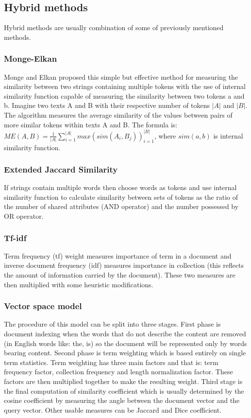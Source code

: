 \subsection{Hybrid methods}
Hybrid methods are usually combination of some of previously mentioned methods.
\subsubsection{Monge-Elkan}
Monge and Elkan proposed this simple but effective method for measuring the similarity between two strings containing multiple tokens with the use of internal similarity function capable of measuring the similarity between two tokens a and b. 
Imagine two texts A and B with their respective number of tokens $\lvert A \rvert$ and $\lvert B\rvert$. 
The algorithm measures the average similarity of the values between pairs of more similar tokens within texts A and B. 
The formula is: 
$ME(A,B)=\frac{1}{\lvert A \rvert} \sum_{i=1}^{\lvert A \rvert} max (sim(A_i, B_j))_{i=1}^{\lvert B\rvert}$, where $sim(a, b)$ is internal similarity function.
\subsubsection{Extended Jaccard Similarity}
If strings contain multiple words then choose words as tokens and use internal similarity function to calculate similarity between sets of tokens as the ratio of the number of shared attributes (AND operator) and the number possessed by OR operator.
\subsubsection{Tf-idf}
Term frequency (tf) weight measures importance of term in a document and inverse document frequency (idf) measures importance in collection (this reflects the amount of information carried by the document). These two measures are then multiplied with some heuristic modifications.

\subsubsection{Vector space model}
The procedure of this model can be split into three stages. First phase is document indexing when the words that do not describe the content are removed (in English words like: the, is) so the document will be represented only by words bearing content. Second phase is term weighting which is based entirely on single term statistics. Term weighting has three main factors and that is: term frequency factor, collection frequency and length normalization factor. These factors are then multiplied together to make the resulting weight. Third stage is the final computation of similarity coefficient which is usually determined by the cosine coefficient by measuring the angle between the document vector and the query vector. Other usable measures can be Jaccard and Dice coefficient.

